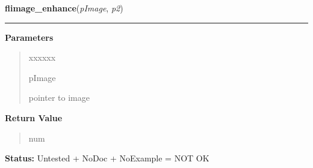 \hspace{.8\funcindent}\begin{boxedminipage}{\funcwidth}

    \raggedright \textbf{flimage\_enhance}(\textit{pImage}, \textit{p2})

    \vspace{-1.5ex}

    \rule{\textwidth}{0.5\fboxrule}
\setlength{\parskip}{2ex}
\setlength{\parskip}{1ex}
      \textbf{Parameters}
      \vspace{-1ex}

      \begin{quote}
        \begin{Ventry}{xxxxxx}

          \item[pImage]

          pointer to image

        \end{Ventry}

      \end{quote}

      \textbf{Return Value}
    \vspace{-1ex}

      \begin{quote}
      num

      \end{quote}

\textbf{Status:} Untested + NoDoc + NoExample = NOT OK



    \end{boxedminipage}

    \label{xformslib:library:flimage_from_pixmap}

    \vspace{0.5ex}

